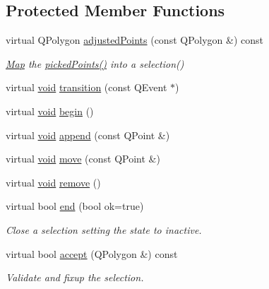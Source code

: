 \subsection*{Protected Member Functions}
\begin{DoxyCompactItemize}
\item 
virtual Q\-Polygon \hyperlink{class_qwt_picker_ad09e8d2241f23b05377155c2f86010f5}{adjusted\-Points} (const Q\-Polygon \&) const 
\begin{DoxyCompactList}\small\item\em \hyperlink{class_map}{Map} the \hyperlink{class_qwt_picker_a9e10695cd170fe335c6959de8d1298a1}{picked\-Points()} into a selection() \end{DoxyCompactList}\item 
virtual \hyperlink{group___u_a_v_objects_plugin_ga444cf2ff3f0ecbe028adce838d373f5c}{void} \hyperlink{class_qwt_picker_a90f9f3485f054c36c1835931e9a387dd}{transition} (const Q\-Event $\ast$)
\item 
virtual \hyperlink{group___u_a_v_objects_plugin_ga444cf2ff3f0ecbe028adce838d373f5c}{void} \hyperlink{class_qwt_picker_a49cb19aea451e275c5d376235e5a1d83}{begin} ()
\item 
virtual \hyperlink{group___u_a_v_objects_plugin_ga444cf2ff3f0ecbe028adce838d373f5c}{void} \hyperlink{class_qwt_picker_a5dd2e0ce6b2a6cc50e345ec13aef9255}{append} (const Q\-Point \&)
\item 
virtual \hyperlink{group___u_a_v_objects_plugin_ga444cf2ff3f0ecbe028adce838d373f5c}{void} \hyperlink{class_qwt_picker_a59d92670978f200edb61e429afa06542}{move} (const Q\-Point \&)
\item 
virtual \hyperlink{group___u_a_v_objects_plugin_ga444cf2ff3f0ecbe028adce838d373f5c}{void} \hyperlink{class_qwt_picker_a217ae414d4967e66def863b019194661}{remove} ()
\item 
virtual bool \hyperlink{class_qwt_picker_ad258c518257cf2f52326905a36efb0c4}{end} (bool ok=true)
\begin{DoxyCompactList}\small\item\em Close a selection setting the state to inactive. \end{DoxyCompactList}\item 
virtual bool \hyperlink{class_qwt_picker_a2c93d65c27fadf2f2522e81f04358604}{accept} (Q\-Polygon \&) const 
\begin{DoxyCompactList}\small\item\em Validate and fixup the selection. \end{DoxyCompactList}\item 

\end{DoxyCompactItemize}
